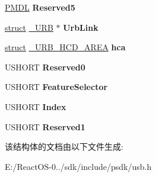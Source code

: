 \begin{DoxyCompactItemize}
\hyperlink{interfacevoid}{P\+M\+DL} {\bfseries Reserved5}
\item 
\mbox{\label{struct___u_r_b___c_o_n_t_r_o_l___f_e_a_t_u_r_e___r_e_q_u_e_s_t_a484fff9b2940e00463db54b8ad65320d}} 
\hyperlink{interfacestruct}{struct} \hyperlink{struct___u_r_b}{\+\_\+\+U\+RB} $\ast$ {\bfseries Urb\+Link}
\item 
\mbox{\label{struct___u_r_b___c_o_n_t_r_o_l___f_e_a_t_u_r_e___r_e_q_u_e_s_t_abcb6d51e6e4706e91c6f3b4115a0fa13}} 
\hyperlink{interfacestruct}{struct} \hyperlink{struct___u_r_b___h_c_d___a_r_e_a}{\+\_\+\+U\+R\+B\+\_\+\+H\+C\+D\+\_\+\+A\+R\+EA} {\bfseries hca}
\item 
\mbox{\label{struct___u_r_b___c_o_n_t_r_o_l___f_e_a_t_u_r_e___r_e_q_u_e_s_t_a7728d3df265f3335714931dba2389d0a}} 
U\+S\+H\+O\+RT {\bfseries Reserved0}
\item 
\mbox{\label{struct___u_r_b___c_o_n_t_r_o_l___f_e_a_t_u_r_e___r_e_q_u_e_s_t_a8912483aee0b3793082673406daa7ec7}} 
U\+S\+H\+O\+RT {\bfseries Feature\+Selector}
\item 
\mbox{\label{struct___u_r_b___c_o_n_t_r_o_l___f_e_a_t_u_r_e___r_e_q_u_e_s_t_a0ef95e76f0135b8749ba289d2e9b9056}} 
U\+S\+H\+O\+RT {\bfseries Index}
\item 
\mbox{\label{struct___u_r_b___c_o_n_t_r_o_l___f_e_a_t_u_r_e___r_e_q_u_e_s_t_adb85508cbaa652ad6d62675b1242afed}} 
U\+S\+H\+O\+RT {\bfseries Reserved1}
\end{DoxyCompactItemize}


该结构体的文档由以下文件生成\+:\begin{DoxyCompactItemize}
\item 
E\+:/\+React\+O\+S-\/0../sdk/include/psdk/usb.\+h\end{DoxyCompactItemize}
